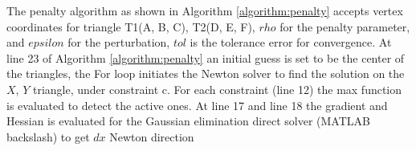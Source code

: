 The penalty algorithm as shown in Algorithm \ref{algorithm:penalty} accepts vertex coordinates for triangle T1(A, B, C), T2(D, E, F), $rho$ for the penalty parameter, and $epsilon$ for the perturbation, $tol$ is the tolerance error for convergence. At line 23 of Algorithm \ref{algorithm:penalty} an initial guess is set to be the center of the triangles, the For loop initiates the Newton solver to find the solution on the $X$, $Y$ triangle, under constraint c. For each constraint (line 12) the max function is evaluated to detect the active ones. At line 17 and line 18 the gradient and Hessian is evaluated for the Gaussian elimination direct solver (MATLAB backslash) to get $dx$ Newton direction

